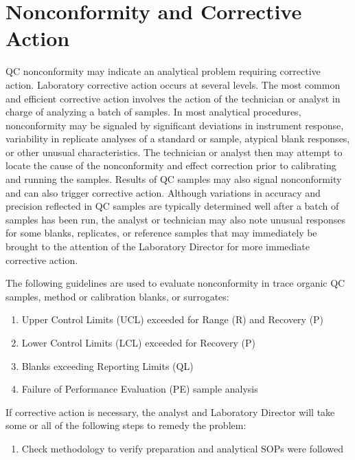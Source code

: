 \section{Nonconformity and Corrective Action}
QC nonconformity may indicate an analytical problem requiring corrective 
action. Laboratory corrective action occurs at several levels. The most 
common and efficient corrective action involves the action of the 
technician or analyst in charge of analyzing a batch of samples. In most 
analytical procedures, nonconformity may be signaled by significant 
deviations in instrument response, variability in replicate analyses of 
a standard or sample, atypical blank responses, or other unusual 
characteristics. The technician or analyst then may attempt to locate 
the cause of the nonconformity and effect correction prior to 
calibrating and running the samples. Results of QC samples may also 
signal nonconformity and can also trigger corrective action. Although 
variations in accuracy and precision reflected in QC samples are 
typically determined well after a batch of samples has been run, the 
analyst or technician may also note unusual responses for some blanks, 
replicates, or reference samples that may immediately be brought to the 
attention of the Laboratory Director for more immediate corrective 
action. 

The following guidelines are used to evaluate nonconformity in trace 
organic QC samples, method or calibration blanks, or surrogates: 

\begin{enumerate}
	\item Upper Control Limits (UCL) exceeded for Range (R) and Recovery (P) 
	\item Lower Control Limits (LCL) exceeded for Recovery (P)
	\item Blanks exceeding Reporting Limits (QL)
	\item Failure of Performance Evaluation (PE) sample analysis
\end{enumerate}

\noindent
 If corrective action is necessary, the analyst and Laboratory 
Director will take some or all of the following steps to remedy the 
problem:

\begin{enumerate}
	\item Check methodology to verify preparation and analytical SOPs were followed
\setcounter{numberedCntB}{\theenumi}
\end{enumerate}


